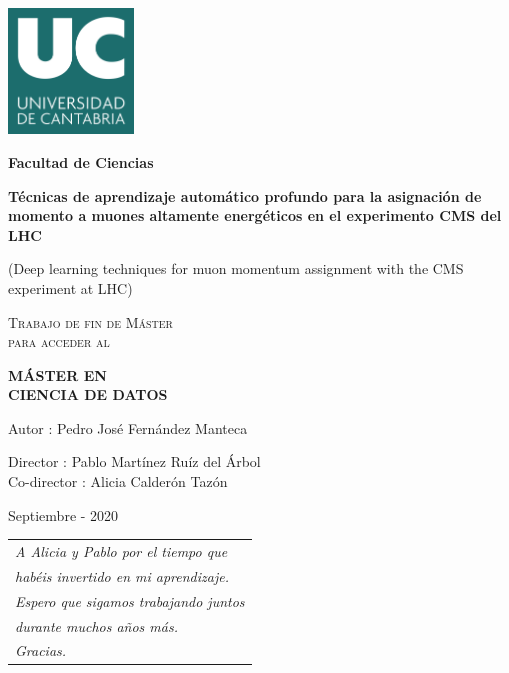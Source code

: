 \documentclass[a4paper,12pt]{article}
\begin{document}
\begin{titlepage}
\centering
\includegraphics[width=0.25\textwidth]{figures/logo_UC.jpg} 
\par 
\vspace{1cm}
{\LARGE \textbf{Facultad de Ciencias} \par}
\vspace{1.5cm}
{\LARGE\bfseries T\'ecnicas de aprendizaje autom\'atico profundo para la asignaci\'on de momento a muones altamente energ\'eticos en el experimento CMS del LHC}
\vspace{0.6cm}
\\
{\LARGE (Deep learning techniques for muon momentum assignment with the CMS experiment at LHC) \par}
\vspace{2.6cm}
{\scshape\large Trabajo de fin de M\'aster \\ para acceder al \par}
\vspace{0.3cm}
{\scshape\Large \textbf{M\'ASTER EN \\ CIENCIA DE DATOS} \par}
\begin{flushright}
\vspace{2.6cm}
{\large Autor : Pedro Jos\'e Fern\'andez Manteca \par}
{\large Director : Pablo Mart\'inez Ru\'iz del \'Arbol\\}
{\large Co-director : Alicia Calder\'on Taz\'on\\}
\vspace{0.5cm}
{\large Septiembre - 2020\par}
\vfill
\end{flushright}
\end{titlepage}


\newpage

\null\hfill\begin{tabular}[t]{l@{}}
  \textit{A Alicia y Pablo por el tiempo que} \\
  \textit{hab\'eis invertido en mi aprendizaje.} \\
  \textit{Espero que sigamos trabajando juntos} \\
  \textit{durante muchos a\~nos m\'as.} \\
  \textit{Gracias.} \\
\end{tabular}
\end{document}
